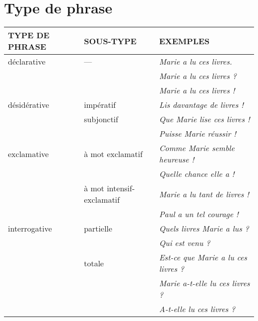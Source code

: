 \documentclass[UTF8]{report}
\begin{document}
\section{Type de phrase}
\begin{table}[H]
\centering
\begin{tabular}{|l|l|l|}
\hline
\rowcolor{cyan!20}
\textbf{TYPE DE PHRASE} & \textbf{SOUS-TYPE} & \textbf{EXEMPLES} \\
\hline
déclarative & — & \textit{Marie a lu ces livres.} \\
& & \textit{Marie a lu ces livres ?} \\
& & \textit{Marie a lu ces livres !} \\
\hline
désidérative & impératif & \textit{Lis davantage de livres !} \\
\cline{2-3}
& subjonctif & \textit{Que Marie lise ces livres !} \\
& & \textit{Puisse Marie réussir !} \\
\hline
exclamative & à mot exclamatif & \textit{Comme Marie semble heureuse !} \\
& & \textit{Quelle chance elle a !} \\
\cline{2-3}
& à mot intensif-exclamatif & \textit{Marie a lu tant de livres !} \\
& & \textit{Paul a un tel courage !} \\
\hline
interrogative & partielle & \textit{Quels livres Marie a lus ?} \\
& & \textit{Qui est venu ?} \\
\cline{2-3}
& totale & \textit{Est-ce que Marie a lu ces livres ?} \\
& & \textit{Marie a-t-elle lu ces livres ?} \\
& & \textit{A-t-elle lu ces livres ?} \\
\hline
\end{tabular}
\end{table}
\end{document}
